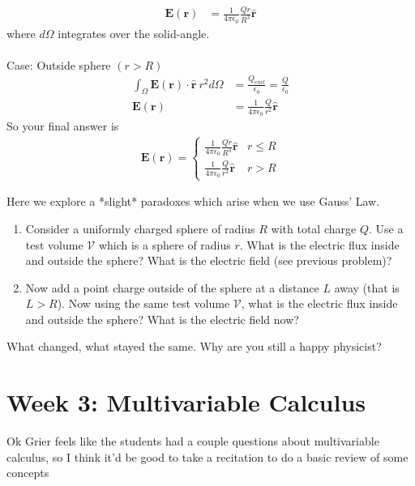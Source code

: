 \documentclass[12pt,fleqn]{article}
\numberwithin{equation}{section} %
\newcounter{problem}
\newcounter{answer}
\begin{document}
\begin{answer}
\begin{align}
		\mathbf E(\mathbf r) & = \frac{1}{4\pi \epsilon_0} \frac{Q r}{R^3} \mathbf{\hat r}
	\end{align}
	where $d\Omega$ integrates over the solid-angle.\\
	\\
	Case: Outside sphere $(r > R)$
	\begin{align}
		\int_\Omega \mathbf E(\mathbf r) \cdot \mathbf{\hat r} ~ r^2 d\Omega & = \frac{Q_{encl}}{\epsilon_0} = \frac{Q}{\epsilon_0}\\
		\mathbf E(\mathbf r) & = \frac{1}{4\pi \epsilon_0}\frac{Q}{r^2} \mathbf{\hat r}
	\end{align}
	So your final answer is
	\begin{align}
		\boxed{\mathbf E(\mathbf r) = \begin{cases}
			\frac{1}{4\pi \epsilon_0} \frac{Q r}{R^3} \mathbf{\hat r} & r \leq R\\
			\frac{1}{4\pi \epsilon_0}\frac{Q}{r^2} \mathbf{\hat r} & r > R
		\end{cases}}
	\end{align}
	
\end{answer}

\begin{problem}
	Here we explore a *slight* paradoxes which arise when we use Gauss' Law. 
	\begin{enumerate}
		\item Consider a uniformly charged sphere of radius $R$ with total charge $Q$. Use a test volume $\mathcal V$ which is a sphere of radius $r$. What is the electric flux inside and outside the sphere? What is the electric field (see previous problem)?
		\item Now add a point charge outside of the sphere at a distance $L$ away (that is $L > R$). Now using the same test volume $\mathcal V$, what is the electric flux inside and outside the sphere? What is the electric field now?
	\end{enumerate}
	What changed, what stayed the same. Why are you still a happy physicist?
\end{problem}



\newpage
\section{Week 3: Multivariable Calculus}
Ok Grier feels like the students had a couple questions about multivariable calculus, so I think it'd be good to take a recitation to do a basic review of some concepts
\end{document}
